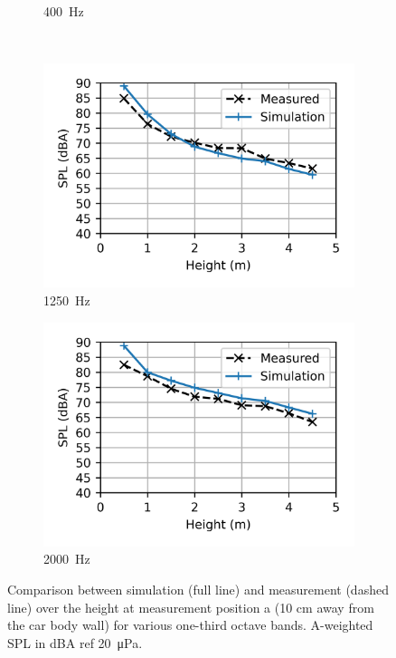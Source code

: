 \begin{figure}
\begin{subfigure}[b]{0.49\textwidth}
		\caption{\SI{400}{\hertz}}
	\end{subfigure}
	\\
	\begin{subfigure}[b]{0.49\textwidth}
		\centering
		\includegraphics{fig/chap5/initial_model/third_octave_over_height/1250_Hz.png}
		\caption{\SI{1250}{\hertz}}
	\end{subfigure}
	\hfill
	\begin{subfigure}[b]{0.49\textwidth}
		\centering
		\includegraphics{fig/chap5/initial_model/third_octave_over_height/2000_Hz.png}
		\caption{\SI{2000}{\hertz}}
	\end{subfigure}
        \caption{Comparison between simulation (full line) and measurement (dashed line) over the height at measurement position a (10 cm away from the car body wall) for various one-third octave bands. A-weighted SPL in dBA ref \SI{20}{\micro\pascal}.}
	\label{fig:third_octave_over_height}
\end{figure}

